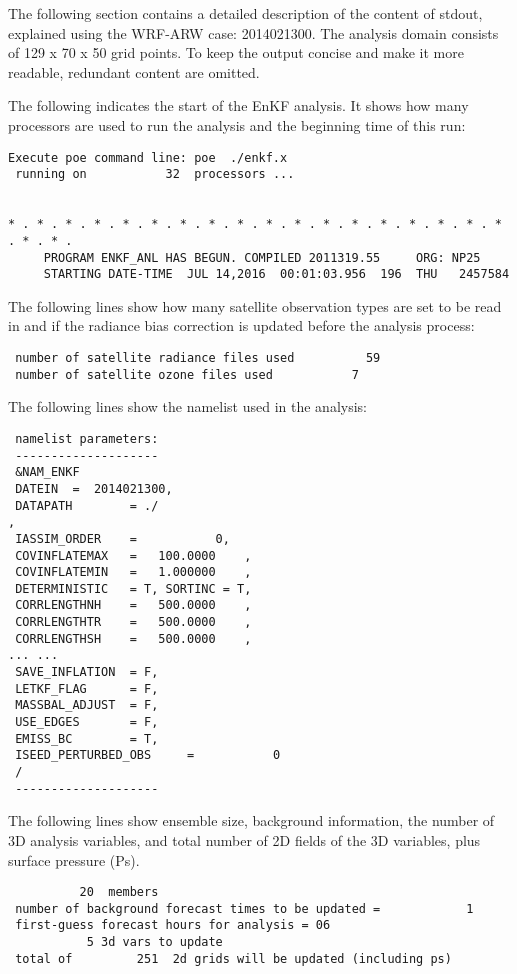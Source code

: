 The following section contains a detailed description of the content of stdout, explained using the WRF-ARW case: 2014021300. The analysis domain consists of 129 x 70 x 50 grid points. To keep the output concise and make it more readable, redundant content are omitted.

The following indicates the start of the EnKF analysis. It shows how many processors are used to run the analysis and the beginning time of this run:
\begin{scriptsize}
\begin{verbatim}
Execute poe command line: poe  ./enkf.x
 running on           32  processors ...


* . * . * . * . * . * . * . * . * . * . * . * . * . * . * . * . * . * . * . * .
     PROGRAM ENKF_ANL HAS BEGUN. COMPILED 2011319.55     ORG: NP25
     STARTING DATE-TIME  JUL 14,2016  00:01:03.956  196  THU   2457584
\end{verbatim}
\end{scriptsize}

The following lines show how many satellite observation types are set to be read in and if the radiance bias correction is updated before the analysis process:
\begin{scriptsize}
\begin{verbatim}
 number of satellite radiance files used          59
 number of satellite ozone files used           7
\end{verbatim}
\end{scriptsize}

The following lines show the namelist used in the analysis:
\begin{scriptsize}
\begin{verbatim}
 namelist parameters:
 --------------------
 &NAM_ENKF
 DATEIN  =  2014021300,
 DATAPATH        = ./                                                                                                    ,
 IASSIM_ORDER    =           0,
 COVINFLATEMAX   =   100.0000    ,
 COVINFLATEMIN   =   1.000000    ,
 DETERMINISTIC   = T, SORTINC = T,
 CORRLENGTHNH    =   500.0000    ,
 CORRLENGTHTR    =   500.0000    ,
 CORRLENGTHSH    =   500.0000    ,
... ...
 SAVE_INFLATION  = F,
 LETKF_FLAG      = F,
 MASSBAL_ADJUST  = F,
 USE_EDGES       = F,
 EMISS_BC        = T,
 ISEED_PERTURBED_OBS     =           0
 /
 --------------------
\end{verbatim}
\end{scriptsize}

The following lines show ensemble size, background information, the number of 3D analysis variables, and total number of 2D fields of the 3D variables, plus surface pressure (Ps).
\begin{scriptsize}
\begin{verbatim}
          20  members
 number of background forecast times to be updated =            1
 first-guess forecast hours for analysis = 06
           5 3d vars to update
 total of         251  2d grids will be updated (including ps)
\end{verbatim}
\end{scriptsize}

